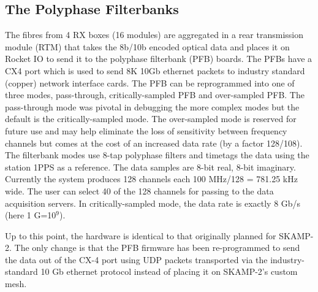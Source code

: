 \subsection{The Polyphase Filterbanks}
The fibres from 4 RX boxes (16 modules) are aggregated in a rear transmission module (RTM) that takes the 8b/10b encoded optical data and places it on Rocket IO to send it to the polyphase filterbank (PFB) boards. The PFBs have a CX4 port which is used to send 8K 10Gb ethernet packets to industry standard (copper) network interface cards. The PFB can be reprogrammed into one of three modes, pass-through, critically-sampled PFB and over-sampled PFB. The pass-through mode was pivotal in debugging the more complex modes but the default is the critically-sampled mode. The over-sampled mode is reserved for future use and may help eliminate the loss of sensitivity between frequency channels but comes at the cost of an increased data rate (by a factor 128/108). The filterbank modes use 8-tap polyphase filters and timetags the data using the station 1PPS as a reference. The data samples are 8-bit real, 8-bit imaginary. Currently the system produces 128 channels each 100 MHz/128 = 781.25 kHz wide. The user can select 40 of the 128 channels for passing to the data acquisition servers. In critically-sampled mode, the data rate is exactly 8 Gb/s (here 1 G=10$^9$).

Up to this point, the hardware is identical to that originally planned for SKAMP-2. The only change is that the PFB firmware has been re-programmed to send the data out of the CX-4 port using UDP packets transported via the industry-standard 10 Gb ethernet protocol instead of placing it on SKAMP-2's custom mesh.


  
  